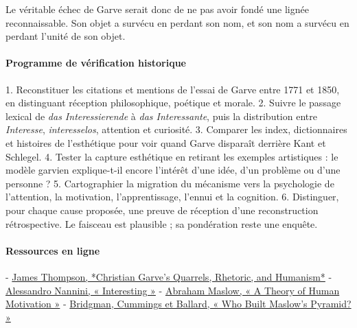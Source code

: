 \documentclass[10pt,a4paper]{article}
\begin{document}
Le véritable échec de Garve serait donc de ne pas avoir fondé une lignée reconnaissable. Son objet a survécu en perdant son nom, et son nom a survécu en perdant l'unité de son objet.

\paragraph{Programme de vérification historique}
1. Reconstituer les citations et mentions de l'essai de Garve entre 1771 et 1850,    en distinguant réception philosophique, poétique et morale. 2. Suivre le passage lexical de \emph{das Interessierende} à \emph{das Interessante}, puis    la distribution entre \emph{Interesse}, \emph{interesselos}, attention et curiosité. 3. Comparer les index, dictionnaires et histoires de l'esthétique pour voir quand    Garve disparaît derrière Kant et Schlegel. 4. Tester la capture esthétique en retirant les exemples artistiques : le modèle    garvien explique-t-il encore l'intérêt d'une idée, d'un problème ou d'une    personne ? 5. Cartographier la migration du mécanisme vers la psychologie de l'attention, la    motivation, l'apprentissage, l'ennui et la cognition. 6. Distinguer, pour chaque cause proposée, une preuve de réception d'une    reconstruction rétrospective. Le faisceau est plausible ; sa pondération reste    une enquête.

\paragraph{Ressources en ligne}
- \href{\detokenize{https://ora.ox.ac.uk/objects/uuid:a138b9d6-7307-4a77-997f-078f30fcea01}}{James Thompson, *Christian Garve's Quarrels, Rhetoric, and Humanism*} - \href{\detokenize{https://lexicon.mimesisjournals.com/archive/2018/autumn/Interesting.pdf}}{Alessandro Nannini, « Interesting »} - \href{\detokenize{https://psychclassics.yorku.ca/Maslow/motivation}}{Abraham Maslow, « A Theory of Human Motivation »} - \href{\detokenize{https://doi.org/10.5465/amle.2017.0351}}{Bridgman, Cummings et Ballard, « Who Built Maslow's Pyramid? »}
\end{document}
